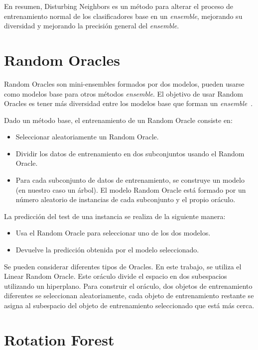 En resumen, Disturbing Neighbors es un método para alterar el proceso de entrenamiento normal de los clasificadores base en un \textit{ensemble}, mejorando su diversidad y mejorando la precisión general del \textit{ensemble}.

\section{Random Oracles}

Random Oracles son mini-ensembles formados por dos modelos, pueden usarse como modelos base para otros métodos \textit{ensemble}. El objetivo de usar Random Oracles es tener más diversidad entre los modelos base que forman un \textit{ensemble}~\cite{randomoracles}.

Dado un método base, el entrenamiento de un Random Oracle consiste en:
\begin{itemize}

	\item Seleccionar aleatoriamente un Random Oracle.
	\item Dividir los datos de entrenamiento en dos subconjuntos usando el Random Oracle.
	\item Para cada subconjunto de datos de entrenamiento, se construye un modelo (en nuestro caso un árbol). El modelo Random Oracle está formado por un número aleatorio de instancias de cada subconjunto y el propio oráculo.
\end{itemize}
La predicción del test de una instancia se realiza de la siguiente manera: 
\begin{itemize}
	\item Usa el Random Oracle para seleccionar uno de los dos modelos.
	\item Devuelve la predicción obtenida por el modelo seleccionado.
\end{itemize}

Se pueden considerar diferentes tipos de Oracles. En este trabajo, se utiliza el Linear Random Oracle. Este oráculo divide el espacio en dos subespacios utilizando un hiperplano. Para construir el oráculo, dos objetos de entrenamiento diferentes se seleccionan aleatoriamente, cada objeto de entrenamiento restante se asigna al subespacio del objeto de entrenamiento seleccionado que está más cerca.

\section{Rotation Forest}

